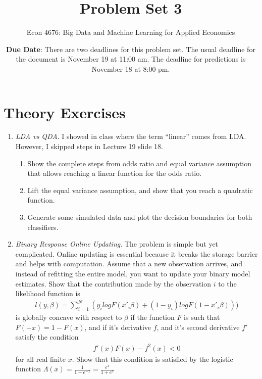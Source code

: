 \documentclass[12pt,onecolumn,A4]{article}
\title{Problem Set 3}
\subtitle{Econ 4676: Big Data and Machine Learning for Applied Economics}
\author{{\bf Due Date}: There are two deadlines for this problem set. The usual deadline for the document is November 19 at 11:00 am. The deadline for predictions is November 18 at 8:00 pm. }
\date{}
\begin{document}
\maketitle

\section{Theory Exercises}

\begin{enumerate}
  \item {\it LDA vs QDA}. I showed in class where the term ``linear'' comes from LDA. However, I skipped steps in Lecture 19 slide 18. 
  \begin{enumerate}
    \item Show the complete steps from odds ratio and equal variance assumption that allows reaching a linear function for the odds ratio. 
    \item Lift the equal variance assumption, and show that you reach a quadratic function. 
    \item Generate some simulated data and plot the decision boundaries for both classifiers. 
  \end{enumerate}
  \item {\it Binary Response Online Updating}. The problem is simple but yet complicated. Online updating is essential because it breaks the storage barrier and helps with computation. Assume that a new observation arrives, and instead of refitting the entire model, you want to update your binary model estimates. Show that the contribution made by the observation $i$ to the likelihood function is
\begin{align}
l(y,\beta) = \sum_{i=1}^N \left( y_i log F(x'_i\beta) + (1-y_i) log F(1-x'_i\beta)  \right))
\end{align}
  is globally concave with respect to $\beta$ if the function $F$ is such that $F(-x)=1-F(x)$, and if it's derivative $f$, and it's second derivative $f'$ satisfy the condition
  \begin{align}
  f'(x)F(x)-f^2(x)<0
  \end{align}
  for all real finite $x$. Show that this condition is satisfied by the logistic function $\Lambda(x)=\frac{1}{1+e^{-x}}=\frac{e^{x}}{1+e^{x}}$


\end{enumerate}
\end{document}
